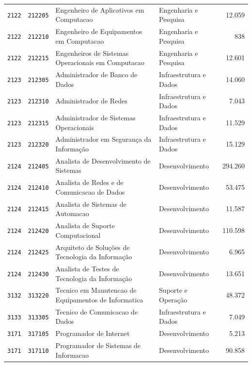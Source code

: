 \begin{quadro}[htbp]
\begin{tabular}{llp{6.2cm}p{3.4cm}r}
        \texttt{2122} & \texttt{212205} & Engenheiro de Aplicativos em Computacao & Engenharia e Pesquisa & 12.059 \\
        \texttt{2122} & \texttt{212210} & Engenheiro de Equipamentos em Computacao & Engenharia e Pesquisa & 838 \\
        \texttt{2122} & \texttt{212215} & Engenheiros de Sistemas Operacionais em Computacao & Engenharia e Pesquisa & 12.601 \\
        \texttt{2123} & \texttt{212305} & Administrador de Banco de Dados & Infraestrutura e Dados & 14.060 \\
        \texttt{2123} & \texttt{212310} & Administrador de Redes & Infraestrutura e Dados & 7.043 \\
        \texttt{2123} & \texttt{212315} & Administrador de Sistemas Operacionais & Infraestrutura e Dados & 11.529 \\
        \texttt{2123} & \texttt{212320} & Administrador em Segurança da Informação & Infraestrutura e Dados & 15.129 \\
        \texttt{2124} & \texttt{212405} & Analista de Desenvolvimento de Sistemas & Desenvolvimento & 294.260 \\
        \texttt{2124} & \texttt{212410} & Analista de Redes e de Comunicacao de Dados & Desenvolvimento & 53.475 \\
        \texttt{2124} & \texttt{212415} & Analista de Sistemas de Automacao & Desenvolvimento & 11.587 \\
        \texttt{2124} & \texttt{212420} & Analista de Suporte Computacional & Desenvolvimento & 110.598 \\
        \texttt{2124} & \texttt{212425} & Arquiteto de Soluções de Tecnologia da Informação & Desenvolvimento & 6.965 \\
        \texttt{2124} & \texttt{212430} & Analista de Testes de Tecnologia da Informação & Desenvolvimento & 13.651 \\
        \texttt{3132} & \texttt{313220} & Tecnico em Manutencao de Equipamentos de Informatica & Suporte e Operação & 48.372 \\
        \texttt{3133} & \texttt{313305} & Tecnico de Comunicacao de Dados & Infraestrutura e Dados & 7.049 \\
        \texttt{3171} & \texttt{317105} & Programador de Internet & Desenvolvimento & 5.213 \\
        \texttt{3171} & \texttt{317110} & Programador de Sistemas de Informacao & Desenvolvimento & 90.858 \\

\end{tabular}
\end{quadro}
